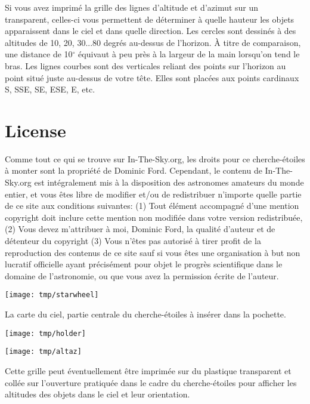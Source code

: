 \documentclass[a4paper,onecolumn,10pt]{article}
\begin{document}
Si vous avez imprimé la grille des lignes d’altitude et d’azimut sur un transparent, celles-ci vous permettent de déterminer à quelle hauteur les objets apparaissent dans le ciel et dans quelle direction. Les cercles sont dessinés à des altitudes de 10, 20, 30...80 degrés au-dessus de l’horizon. À titre de comparaison, une distance de 10$^\circ$ équivaut à peu près à la largeur de la main lorsqu’on tend le bras. Les lignes courbes sont des verticales reliant des points sur l’horizon au point situé juste au-dessus de votre tête. Elles sont placées aux points cardinaux S, SSE, SE, ESE, E, etc.


\section*{License}

Comme tout ce qui se trouve sur In-The-Sky.org, les droits pour ce cherche-étoiles à monter sont la propriété de Dominic Ford. Cependant, le contenu de In-The-Sky.org est intégralement mis à la disposition des astronomes amateurs du monde entier, et vous êtes libre de modifier et/ou de redistribuer n’importe quelle partie de ce site aux conditions suivantes: (1) Tout élément accompagné d’une mention copyright doit inclure cette mention non modifiée dans votre version redistribuée, (2) Vous devez m’attribuer à moi, Dominic Ford, la qualité d’auteur et de détenteur du copyright (3) Vous n’êtes pas autorisé à tirer profit de la reproduction des contenus de ce site sauf si vous êtes une organisation à but non lucratif officielle ayant précisément pour objet le progrès scientifique dans le domaine de l’astronomie, ou que vous avez la permission écrite de l’auteur.

\newpage

\centerline{\texttt{[image: tmp/starwheel]}}

\vspace{1cm}
La carte du ciel, partie centrale du cherche-étoiles à insérer dans la pochette.

\newpage
\thispagestyle{empty}
\vspace*{-3.0cm}
\centerline{\texttt{[image: tmp/holder]}}
\newpage

\centerline{\texttt{[image: tmp/altaz]}}

\vspace{1cm}
Cette grille peut éventuellement être imprimée sur du plastique transparent et collée sur l’ouverture pratiquée dans le cadre du cherche-étoiles pour afficher les altitudes des objets dans le ciel et leur orientation.
\end{document}

